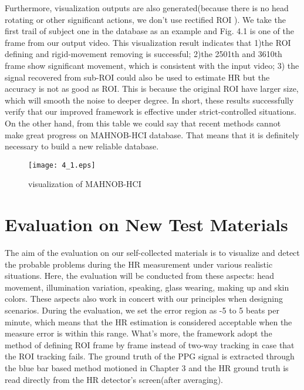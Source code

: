 Furthermore, visualization outputs are also generated(because there is no head rotating or other significant actions, we don't use rectified ROI ). We take the first trail of subject one in the database as an example and Fig. 4.1 is one of the frame from our output video. This visualization result indicates that 1)the ROI defining and rigid-movement removing is successful; 2)the 2501th and 3610th frame show significant movement, which is consistent with the input video; 3) the signal recovered from sub-ROI could also be used to estimate HR but the accuracy is not as good as ROI. This is because the original ROI have larger size, which will smooth the noise to deeper degree. In short, these results successfully verify that our improved framework is effective under strict-controlled situations. On the other hand, from this table we could say that recent methods cannot make great progress on MAHNOB-HCI database. That means that it is definitely necessary to build a new reliable database.

\begin{figure}[ht]
\centering
\texttt{[image: 4\_1.eps]}
\caption{visualization of MAHNOB-HCI}\label{fig:noted-figure}
\end{figure}

\section{Evaluation on New Test Materials}
The aim of the evaluation on our self-collected materials is to visualize and detect the probable problems during the HR measurement under various realistic situations. Here, the evaluation will be conducted from these aspects: head movement, illumination variation, speaking, glass wearing, making up and skin colors. These aspects also work in concert with our principles when designing scenarios. During the evaluation, we set the error region as -5 to 5 beats per minute, which means that the HR estimation is considered acceptable when the measure error is within this range. What's more, the framework adopt the method of defining ROI frame by frame instead of two-way tracking in case that the ROI tracking fails. The ground truth of the PPG signal is extracted through the blue bar based method motioned in Chapter 3 and the HR ground truth is read directly from the HR detector's screen(after averaging).

